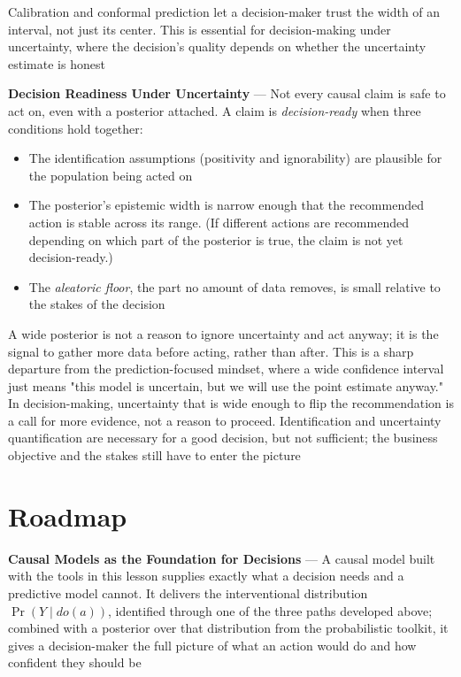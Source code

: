 Calibration and conformal prediction let a decision-maker trust the width of an interval,
not just its center. This is essential for decision-making under uncertainty,
where the decision's quality depends on whether the uncertainty estimate is
honest

\textbf{Decision Readiness Under Uncertainty} --- Not every causal claim is safe
to act on, even with a posterior attached. A claim is \emph{decision-ready} when
three conditions hold together:

\begin{itemize}
  \item The identification assumptions (positivity and ignorability) are plausible
    for the population being acted on

  \item The posterior's epistemic width is narrow enough that the recommended action
    is stable across its range. (If different actions are recommended depending on
    which part of the posterior is true, the claim is not yet decision-ready.)

  \item The \emph{aleatoric floor}, the part no amount of data removes, is small
    relative to the stakes of the decision
\end{itemize}

A wide posterior is not a reason to ignore uncertainty and act anyway; it is the
signal to gather more data before acting, rather than after. This is a sharp departure
from the prediction-focused mindset, where a wide confidence interval just means
"this model is uncertain, but we will use the point estimate anyway." In
decision-making, uncertainty that is wide enough to flip the recommendation is a
call for more evidence, not a reason to proceed. Identification and uncertainty quantification
are necessary for a good decision, but not sufficient; the business objective and
the stakes still have to enter the picture

\section{Roadmap}
\label{sec:roadmap}

\textbf{Causal Models as the Foundation for Decisions} --- A causal model built
with the tools in this lesson supplies exactly what a decision needs and a
predictive model cannot. It delivers the interventional distribution $\Pr(Y \mid
do(a))$, identified through one of the three paths developed above; combined with
a posterior over that distribution from the probabilistic toolkit, it gives a
decision-maker the full picture of what an action would do and how confident
they should be

